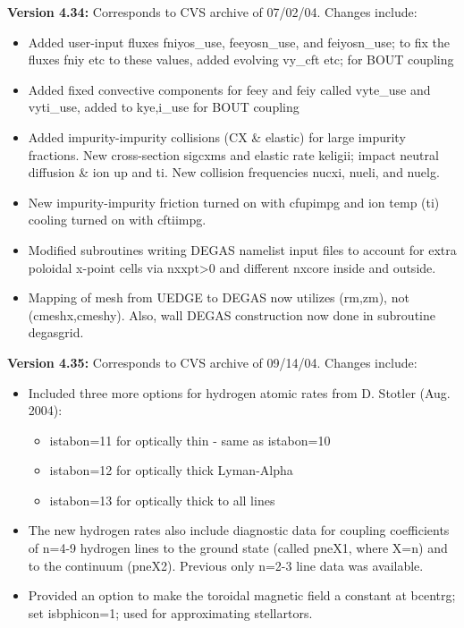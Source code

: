 \documentclass [12pt]{article}
\begin{document}
\noindent\textbf{Version 4.34:} Corresponds to CVS archive of 07/02/04.  
Changes include:
\begin{itemize}
  \item Added user-input fluxes fniyos\_use, feeyosn\_use, and feiyosn\_use; 
          to fix the fluxes fniy etc to these values, added evolving vy\_cft 
          etc; for BOUT coupling
  \item Added fixed convective components for feey and feiy called
          vyte\_use and vyti\_use, added to kye,i\_use for BOUT coupling
  \item Added impurity-impurity collisions (CX \& elastic) for large
          impurity fractions.  New cross-section sigcxms and elastic
          rate keligii; impact neutral diffusion \& ion up and ti.
          New collision frequencies nucxi, nueli, and nuelg.
  \item New impurity-impurity friction turned on with cfupimpg and
          ion temp (ti) cooling turned on with cftiimpg.
  \item Modified subroutines writing DEGAS namelist input files to
          account for extra poloidal x-point cells via nxxpt>0 and
          different nxcore inside and outside.
  \item Mapping of mesh from UEDGE to DEGAS now utilizes (rm,zm), 
          not (cmeshx,cmeshy). Also, wall DEGAS construction now done
          in subroutine degasgrid.
\end{itemize}

\noindent\textbf{Version 4.35:} Corresponds to CVS archive of 09/14/04.  
Changes include:
\begin{itemize}
   \item Included three more options for hydrogen atomic rates from
          D. Stotler (Aug. 2004):
      \begin{itemize}
        \item istabon=11 for optically thin - same as istabon=10
        \item istabon=12 for optically thick Lyman-Alpha
        \item istabon=13 for optically thick to all lines
      \end{itemize}
   \item The new hydrogen rates also include diagnostic data for
          coupling coefficients of n=4-9 hydrogen lines to the ground
          state (called pneX1, where X=n) and to the continuum (pneX2).
          Previous only n=2-3 line data was available.
   \item Provided an option to make the toroidal magnetic field a 
          constant at bcentrg; set isbphicon=1; used for approximating
          stellartors.
\end{itemize}
\end{document}
